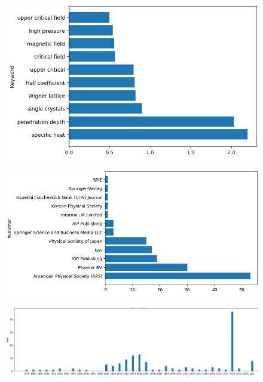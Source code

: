 \documentclass[a4paper,10pt]{article}
\begin{document}
\begin{figure}[h]
    \centering
    \includegraphics[width=\linewidth]{keyword-top10-body-distribution}
    \label{fig:keyword-top10-body}
\end{figure}

\begin{figure}[h]
    \centering
    \includegraphics[width=\linewidth]{paper-by-publishers}
    \label{fig:keyword-top10-body}
\end{figure}

\begin{figure}[h]
    \centering
    \includegraphics[width=\linewidth]{supermat-distribution-by-year}
    \label{fig:keyword-top10-body}
\end{figure}
\end{document}

